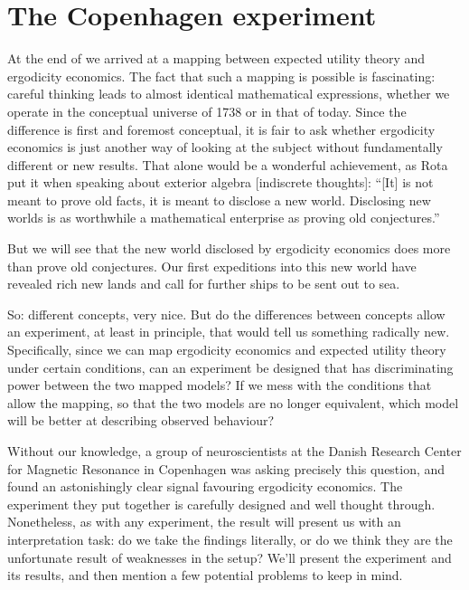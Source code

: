 \section{The Copenhagen experiment}
At the end of  we arrived at a mapping between expected utility 
theory and ergodicity economics. The fact that such a mapping is possible is fascinating: careful 
thinking leads to almost identical mathematical expressions, whether we operate in the conceptual
universe of 1738 or in that of today. Since the difference is first and foremost conceptual, 
it is fair to ask whether ergodicity economics is just another way of looking at the subject
without fundamentally different or new results. That alone would be a wonderful achievement,
as Rota put it when speaking about exterior algebra \cite[p.48]{Rota} [indiscrete thoughts]: 
``[It] is not meant to prove old facts, it is meant to disclose a new world. Disclosing new 
worlds is as worthwhile a mathematical enterprise as proving old conjectures.''

But we will see that the new world disclosed by ergodicity economics does more than 
prove old conjectures. Our first expeditions into this new world have revealed rich 
new lands and call for further ships to be sent out to sea.

So: different concepts, very nice. But do the differences between concepts allow an experiment, 
at least in principle, that would tell us something radically new. Specifically, since we can 
map ergodicity economics and expected utility theory under certain conditions, can an experiment
be designed that has discriminating power between the two mapped models? If we mess with the
conditions that allow the mapping, so that the two models are no longer equivalent, which model
will be better at describing observed behaviour?

Without our knowledge, a group of neuroscientists at the Danish Research Center for Magnetic 
Resonance in Copenhagen was asking precisely this question, and found an astonishingly clear
signal favouring ergodicity economics. The experiment they put together is
carefully designed and well thought through. Nonetheless, as with any experiment, the result will 
present us with an interpretation task: do we take the findings literally, or do we think they are 
the unfortunate result of weaknesses in the setup? We'll present the experiment and its results, 
and then mention a few potential problems to keep in mind.

